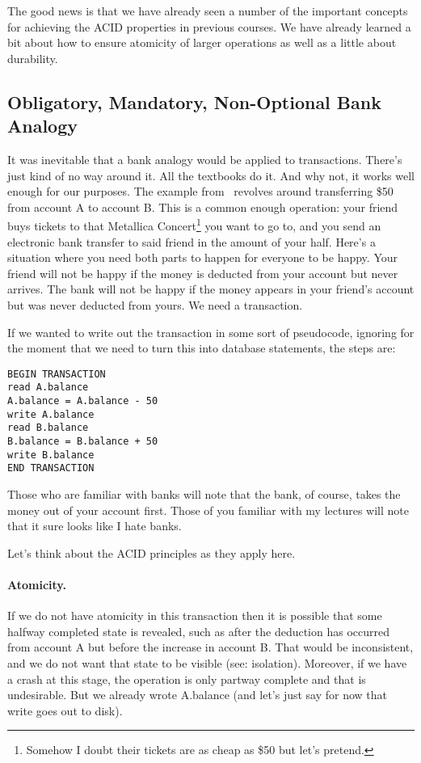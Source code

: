 \documentclass[a4paper]{report}
\begin{document}
The good news is that we have already seen a number of the important concepts for achieving the ACID properties in previous courses. We have already learned a bit about how to ensure atomicity of larger operations as well as a little about durability.

\subsection*{Obligatory, Mandatory, Non-Optional Bank Analogy}
It was inevitable that a bank analogy would be applied to transactions. There's just kind of no way around it. All the textbooks do it. And why not, it works well enough for our purposes. The example from~\cite{dsc} revolves around transferring \$50 from account A to account B. This is a common enough operation: your friend buys tickets to that Metallica Concert\footnote{Somehow I doubt their tickets are as cheap as \$50 but let's pretend.} you want to go to, and you send an electronic bank transfer to said friend in the amount of your half.  Here's a situation where you need both parts to happen for everyone to be happy. Your friend will not be happy if the money is deducted from your account but never arrives. The bank will not be happy if the money appears in your friend's account but was never deducted from yours. We need a transaction.

If we wanted to write out the transaction in some sort of pseudocode, ignoring for the moment that we need to turn this into database statements, the steps are:

\begin{verbatim}
BEGIN TRANSACTION
read A.balance
A.balance = A.balance - 50
write A.balance
read B.balance
B.balance = B.balance + 50
write B.balance
END TRANSACTION
\end{verbatim}

Those who are familiar with banks will note that the bank, of course, takes the money out of your account first. Those of you familiar with my lectures will note that it sure looks like I hate banks.

Let's think about the ACID principles as they apply here.

\paragraph{Atomicity.} If we do not have atomicity in this transaction then it is possible that some halfway completed state is revealed, such as after the deduction has occurred from account A but before the increase in account B. That would be inconsistent, and we do not want that state to be visible (see: isolation). Moreover, if we have a crash at this stage, the operation is only partway complete and that is undesirable. But we already wrote A.balance (and let's just say for now that write goes out to disk).
\end{document}
